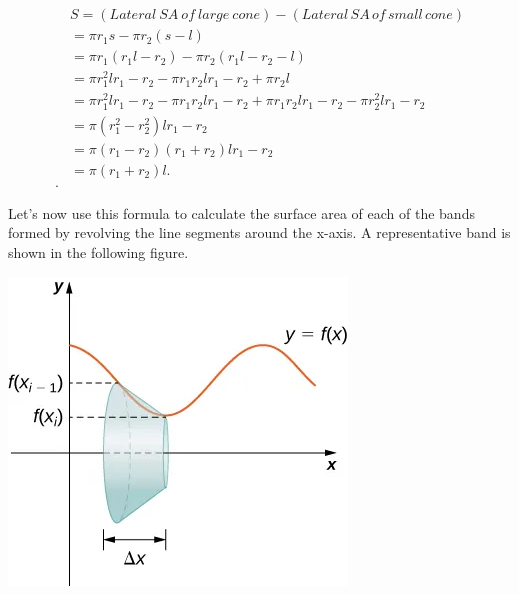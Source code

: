 \documentclass{report}
\begin{document}
    \begin{align*}
        &S = (Lateral\ SA\ of\ large\ cone) - (Lateral \, SA \, of \, small \, cone)  \\
        &= \pi r_1 s - \pi r_2 (s - l)  \\
        &= \pi r_1 (r_1 l - r_2) - \pi r_2 (r_1 l - r_2 - l)  \\
        &= \pi r_1^2 l r_1 - r_2 - \pi r_1 r_2 l r_1 - r_2 + \pi r_2 l  \\
        &= \pi r_1^2 l r_1 - r_2 - \pi r_1 r_2 l r_1 - r_2 + \pi r_1 r_2 l r_1 - r_2 - \pi r_2^2 l r_1 - r_2  \\
        &= \pi (r_1^2 - r_2^2) l r_1 - r_2  \\
        &= \pi (r_1 - r_2)(r_1 + r_2) l r_1 - r_2  \\
        &= \pi (r_1 + r_2) l. \\
    .\end{align*}
    \bigbreak \noindent 
    \begin{minipage}[]{0.47\textwidth}
        Let’s now use this formula to calculate the surface area of each of the bands formed by revolving the line segments around the  x-axis. A representative band is shown in the following figure.
    \end{minipage}
    \begin{minipage}[]{0.47\textwidth}
        \begin{center}
            \includegraphics[scale=0.5]{./figures/graph36.png}
        \end{center}
    \end{minipage}
\end{document}
